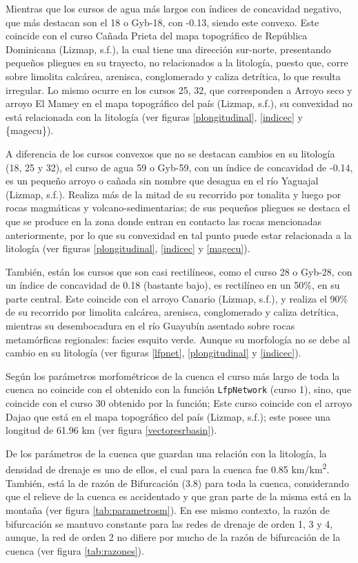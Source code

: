 \documentclass[11pt,]{article}
\begin{document}
Mientras que los cursos de agua más largos con índices de concavidad
negativo, que más destacan son el 18 o Gyb-18, con -0.13, siendo este
convexo. Este coincide con el curso Cañada Prieta del mapa topográfico
de República Dominicana (Lizmap, s.f.), la cual tiene una dirección
sur-norte, presentando pequeños pliegues en su trayecto, no relacionados
a la litología, puesto que, corre sobre limolita calcárea, arenisca,
conglomerado y caliza detrítica, lo que resulta irregular. Lo mismo
ocurre en los cursos 25, 32, que corresponden a Arroyo seco y arroyo El
Mamey en el mapa topográfico del país (Lizmap, s.f.), su convexidad no
está relacionada con la litología (ver figuras \ref{plongitudinal},
\ref{indicec} y \{magecu\}).

A diferencia de los cursos convexos que no se destacan cambios en su
litología (18, 25 y 32), el curso de agua 59 o Gyb-59, con un índice de
concavidad de -0.14, es un pequeño arroyo o cañada sin nombre que
desagua en el río Yaguajal (Lizmap, s.f.). Realiza más de la mitad de su
recorrido por tonalita y luego por rocas magmáticas y
volcano-sedimentarias; de sus pequeños pliegues se destaca el que se
produce en la zona donde entran en contacto las rocas mencionadas
anteriormente, por lo que su convexidad en tal punto puede estar
relacionada a la litología (ver figuras \ref{plongitudinal},
\ref{indicec} y \ref{magecu}).

También, están los cursos que son casi rectilíneos, como el curso 28 o
Gyb-28, con un índice de concavidad de 0.18 (bastante bajo), es
rectilíneo en un 50\%, en su parte central. Este coincide con el arroyo
Canario (Lizmap, s.f.), y realiza el 90\% de su recorrido por limolita
calcárea, arenisca, conglomerado y caliza detrítica, mientras su
desembocadura en el río Guayubín asentado sobre rocas metamórficas
regionales: facies esquito verde. Aunque su morfología no se debe al
cambio en su litología (ver figuras \ref{lfpnet}, \ref{plongitudinal} y
\ref{indicec}).

Según los parámetros morfométricos de la cuenca el curso más largo de
toda la cuenca no coincide con el obtenido con la función
\texttt{LfpNetwork} (curso 1), sino, que coincide con el curso 30
obtenido por la función; Este curso coincide con el arroyo Dajao que
está en el mapa topográfico del país (Lizmap, s.f.); este posee una
longitud de 61.96 km (ver figura \ref{vectoresrbasin}).

De los parámetros de la cuenca que guardan una relación con la
litología, la densidad de drenaje es uno de ellos, el cual para la
cuenca fue 0.85 km/km\textsuperscript{2}. También, está la de razón de
Bifurcación (3.8) para toda la cuenca, considerando que el relieve de la
cuenca es accidentado y que gran parte de la misma está en la montaña
(ver figura \ref{tab:parametrosm}). En ese mismo contexto, la razón de
bifurcación se mantuvo constante para las redes de drenaje de orden 1, 3
y 4, aunque, la red de orden 2 no difiere por mucho de la razón de
bifurcación de la cuenca (ver figura \ref{tab:razones}).
\end{document}
